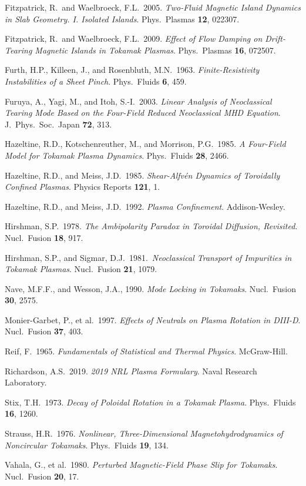 \documentclass[notitlepage,12pt]{article}
\begin{document}
\begin{description}
\item Fitzpatrick, R.\ and Waelbroeck, F.L.\ 2005. {\em Two-Fluid Magnetic Island Dynamics in Slab Geometry. I. Isolated Islands}.
Phys.\ Plasmas {\bf 12}, 022307. 
\item Fitzpatrick, R.\ and Waelbroeck, F.L.\ 2009. {\em Effect of Flow Damping on Drift-Tearing Magnetic Islands in Tokamak Plasmas}.
Phys.\ Plasmas {\bf 16}, 072507.
\item Furth, H.P., Killeen, J., and Rosenbluth, M.N.\ 1963. {\em Finite-Resistivity Instabilities of a Sheet Pinch}. Phys.\ Fluids {\bf 6}, 459.
\item Furuya, A., Yagi, M., and Itoh, S.-I.\ 2003. {\em Linear Analysis of Neoclassical Tearing Mode
Based on the Four-Field Reduced Neoclassical MHD Equation}. J.\ Phys.\ Soc.\ Japan {\bf 72}, 313.
\item Hazeltine, R.D., Kotschenreuther, M., and Morrison, P.G.\ 1985. {\em A Four-Field Model for Tokamak Plasma Dynamics}.
 Phys.\ Fluids {\bf 28}, 2466.
\item Hazeltine, R.D., and Meiss, J.D.\ 1985. {\em Shear-Alfv\'{e}n Dynamics of Toroidally Confined Plasmas}. Physics Reports {\bf 121}, 1.
\item Hazeltine, R.D., and Meiss, J.D.\ 1992. {\em Plasma Confinement}. Addison-Wesley. 
\item Hirshman, S.P.\ 1978. {\em The Ambipolarity Paradox in Toroidal Diffusion, Revisited}. Nucl.\ Fusion {\bf 18}, 917.
\item Hirshman, S.P., and Sigmar, D.J.\ 1981.\ {\em Neoclassical Transport of Impurities in Tokamak Plasmas}. Nucl.\ Fusion {\bf 21}, 1079.
\item Nave, M.F.F., and Wesson, J.A., 1990. {\em Mode Locking in Tokamaks}. Nucl.\ Fusion {\bf 30}, 2575. 
\item Monier-Garbet, P., et al.\ 1997. {\em Effects of Neutrals on Plasma Rotation in DIII-D}. Nucl.\ Fusion {\bf 37}, 403.
\item Reif, F.\ 1965. {\em Fundamentals of Statistical and Thermal Physics}. McGraw-Hill.
\item Richardson, A.S.\ 2019. {\em 2019 NRL Plasma Formulary}.  Naval Research Laboratory.
\item Stix, T.H.\ 1973. {\em Decay of Poloidal Rotation in a Tokamak Plasma}. Phys.\ Fluids {\bf 16}, 1260.
\item Strauss, H.R.\ 1976. {\em Nonlinear, Three-Dimensional Magnetohydrodynamics of  Noncircular Tokamaks}. Phys.\ Fluids {\bf 19},  134.
\item Vahala, G., et al.\ 1980. {\em Perturbed Magnetic-Field Phase Slip for Tokamaks}. Nucl.\ Fusion {\bf 20}, 17.

\end{description}
\end{document}
